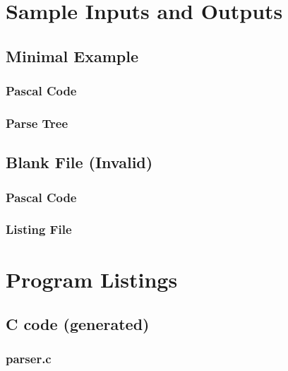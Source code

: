 \documentclass[titlepage]{article}
\begin{document}
	\section{Sample Inputs and Outputs}
		\subsection{Minimal Example}
			\begin{minipage}[t]{0.5\textwidth}
				\subsubsection{Pascal Code}
				
			\end{minipage}
			\begin{minipage}[t]{0.5\textwidth}
				\subsubsection{Parse Tree}
				
			\end{minipage}
		\subsection{Blank File (Invalid)}
			\begin{minipage}[t]{0.5\textwidth}
				\subsubsection{Pascal Code}
				
			\end{minipage}
			\begin{minipage}[t]{0.5\textwidth}
				\subsubsection{Listing File}
				
			\end{minipage}
	\pagebreak
	\section{Program Listings}
		\ifdefined{}
		\subsection{C code (generated)}
			\subsubsection{parser.c}
			
\end{document}
